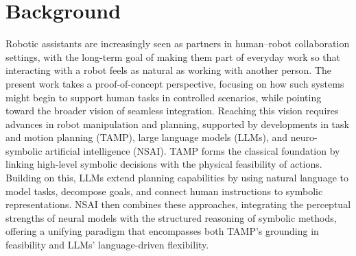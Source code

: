 \documentclass[12pt]{extarticle}
\begin{document}
\section{Background}
Robotic assistants are increasingly seen as partners in human–robot collaboration settings, with the long-term goal of making them part of everyday work so that interacting with a robot feels as natural as working with another person. The present work takes a proof-of-concept perspective, focusing on how such systems might begin to support human tasks in controlled scenarios, while pointing toward the broader vision of seamless integration. Reaching this vision requires advances in robot manipulation and planning, supported by developments in task and motion planning (TAMP), large language models (LLMs), and neuro-symbolic artificial intelligence (NSAI). TAMP forms the classical foundation by linking high-level symbolic decisions with the physical feasibility of actions. Building on this, LLMs extend planning capabilities by using natural language to model tasks, decompose goals, and connect human instructions to symbolic representations. NSAI then combines these approaches, integrating the perceptual strengths of neural models with the structured reasoning of symbolic methods, offering a unifying paradigm that encompasses both TAMP’s grounding in feasibility and LLMs’ language-driven flexibility.
\end{document}
